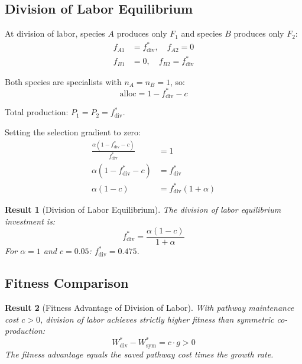 \documentclass[11pt]{article}
\newtheorem{theorem}{Result}
\theoremstyle{definition}
\begin{document}
\subsection{Division of Labor Equilibrium}

At division of labor, species $A$ produces only $F_1$ and species $B$ produces only $F_2$:
\begin{align}
f_{A1} &= f^*_{\text{div}}, \quad f_{A2} = 0 \\
f_{B1} &= 0, \quad f_{B2} = f^*_{\text{div}}
\end{align}

Both species are specialists with $n_A = n_B = 1$, so:
\begin{equation}
\text{alloc} = 1 - f^*_{\text{div}} - c
\end{equation}

Total production: $P_1 = P_2 = f^*_{\text{div}}$.

Setting the selection gradient to zero:
\begin{align}
\frac{\alpha(1 - f^*_{\text{div}} - c)}{f^*_{\text{div}}} &= 1 \\
\alpha(1 - f^*_{\text{div}} - c) &= f^*_{\text{div}} \\
\alpha(1 - c) &= f^*_{\text{div}}(1 + \alpha)
\end{align}

\begin{theorem}[Division of Labor Equilibrium]
The division of labor equilibrium investment is:
\begin{equation}
f^*_{\text{div}} = \frac{\alpha(1 - c)}{1 + \alpha}
\label{eq:f_div}
\end{equation}
For $\alpha = 1$ and $c = 0.05$: $f^*_{\text{div}} = 0.475$.
\end{theorem}

\subsection{Fitness Comparison}

\begin{theorem}[Fitness Advantage of Division of Labor]
With pathway maintenance cost $c > 0$, division of labor achieves strictly higher fitness than symmetric co-production:
\begin{equation}
W^*_{\text{div}} - W^*_{\text{sym}} = c \cdot g > 0
\label{eq:fitness_advantage}
\end{equation}
The fitness advantage equals the saved pathway cost times the growth rate.
\end{theorem}
\end{document}
